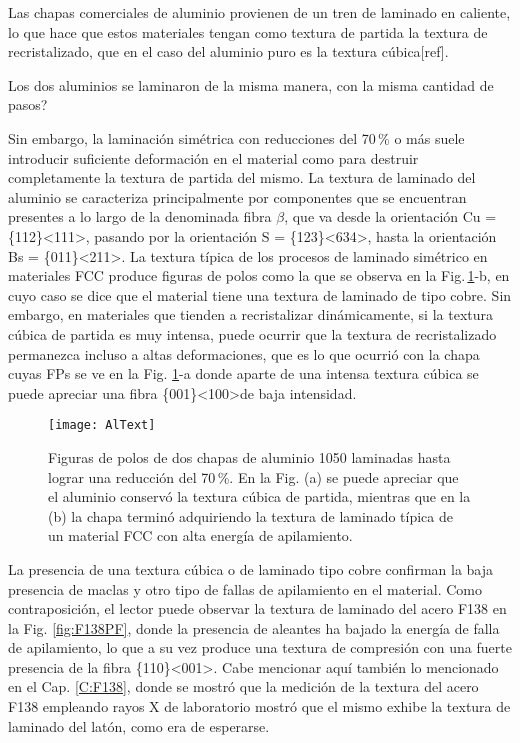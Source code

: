 Las chapas comerciales de aluminio provienen de un tren de laminado en caliente, lo que hace que estos materiales tengan como textura de partida la textura de recristalizado, que en el caso del aluminio puro es la textura cúbica[ref].

Los dos aluminios se laminaron de la misma manera, con la misma cantidad de pasos?

Sin embargo, la laminación simétrica con reducciones del 70\,\% o más suele introducir suficiente deformación en el material como para destruir completamente la textura de partida del mismo.
La textura de laminado del aluminio se caracteriza principalmente por componentes que se encuentran presentes a lo largo de la denominada fibra $\beta$, que va desde la orientación Cu = \{112\}\textless 111\textgreater, pasando por la orientación S = \{123\}\textless 634\textgreater, hasta la orientación Bs = \{011\}\textless 211\textgreater\cite{jata2013aluminum,Hirsch19882863,Engler1996187}.
La textura típica de los procesos de laminado simétrico en materiales FCC produce figuras de polos como la que se observa en la Fig.\,\ref{fig:AlPDF}-b, en cuyo caso se dice que el material tiene una textura de laminado de tipo cobre\cite{kocks2000texture}. Sin embargo, en materiales que tienden a recristalizar dinámicamente, si la textura cúbica de partida es muy intensa, puede ocurrir que la textura de recristalizado permanezca incluso a altas deformaciones, que es lo que ocurrió con la chapa cuyas FPs se ve en la Fig. \ref{fig:AlPDF}-a donde aparte de una intensa textura cúbica se puede apreciar una fibra \{001\}\textless 100\textgreater de baja intensidad.

\begin{figure}[!htb]
  \centering
  \texttt{[image: AlText]}
  \caption{Figuras de polos de dos chapas de aluminio 1050 laminadas hasta lograr una reducción del 70\,\%. En la Fig. (a) se puede apreciar que el aluminio conservó la textura cúbica de partida, mientras que en la (b) la chapa terminó adquiriendo la textura de laminado típica de un material FCC con alta energía de apilamiento.}
  \label{fig:AlPDF}
\end{figure}

La presencia de una textura cúbica o de laminado tipo cobre confirman la baja presencia de maclas y otro tipo de fallas de apilamiento en el material.
Como contraposición, el lector puede observar la textura de laminado del acero F138 en la Fig. \ref{fig:F138PF}, donde la presencia de aleantes ha bajado la energía de falla de apilamiento, lo que a su vez produce una textura de compresión con una fuerte presencia de la fibra \{110\}\textless 001\textgreater.
Cabe mencionar aquí también lo mencionado en el Cap. \ref{C:F138}, donde se mostró que la medición de la textura del acero F138 empleando rayos X de laboratorio mostró que el mismo exhibe la textura de laminado del latón, como era de esperarse.

